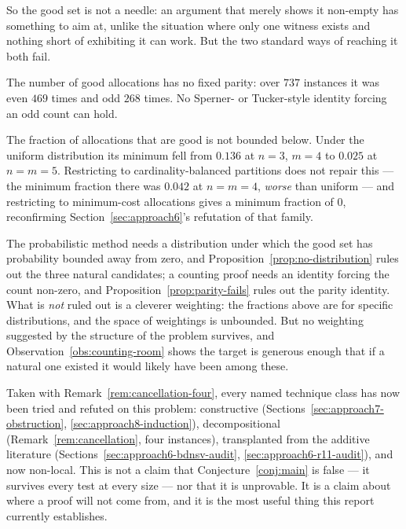 So the good set is not a needle: an argument that merely shows it non-empty has
something to aim at, unlike the situation where only one witness exists and
nothing short of exhibiting it can work. But the two standard ways of reaching it
both fail.

\begin{proposition}
\label{prop:parity-fails}
The number of good allocations has no fixed parity: over $737$ instances it was
even $469$ times and odd $268$ times. No Sperner- or Tucker-style identity forcing
an odd count can hold.
\end{proposition}

\begin{proposition}
\label{prop:no-distribution}
The fraction of allocations that are good is not bounded below. Under the uniform
distribution its minimum fell from $0.136$ at $n=3$, $m=4$ to $0.025$ at $n=m=5$.
Restricting to cardinality-balanced partitions does not repair this --- the
minimum fraction there was $0.042$ at $n=m=4$, \emph{worse} than uniform --- and
restricting to minimum-cost allocations gives a minimum fraction of $0$,
reconfirming Section~\ref{sec:approach6}'s refutation of that family.
\end{proposition}

The probabilistic method needs a distribution under which the good set has
probability bounded away from zero, and Proposition~\ref{prop:no-distribution}
rules out the three natural candidates; a counting proof needs an identity forcing
the count non-zero, and Proposition~\ref{prop:parity-fails} rules out the parity
identity. What is \emph{not} ruled out is a cleverer weighting: the fractions above
are for specific distributions, and the space of weightings is unbounded. But no
weighting suggested by the structure of the problem survives, and
Observation~\ref{obs:counting-room} shows the target is generous enough that if a
natural one existed it would likely have been among these.

\begin{remark}
\label{rem:technique-classes}
Taken with Remark~\ref{rem:cancellation-four}, every named technique class has now
been tried and refuted on this problem: constructive
(Sections~\ref{sec:approach7-obstruction}, \ref{sec:approach8-induction}),
decompositional (Remark~\ref{rem:cancellation}, four instances), transplanted from
the additive literature (Sections~\ref{sec:approach6-bdnsv-audit},
\ref{sec:approach6-r11-audit}), and now non-local. This is not a claim that
Conjecture~\ref{conj:main} is false --- it survives every test at every size --- nor
that it is unprovable. It is a claim about where a proof will not come from, and
it is the most useful thing this report currently establishes.
\end{remark}

